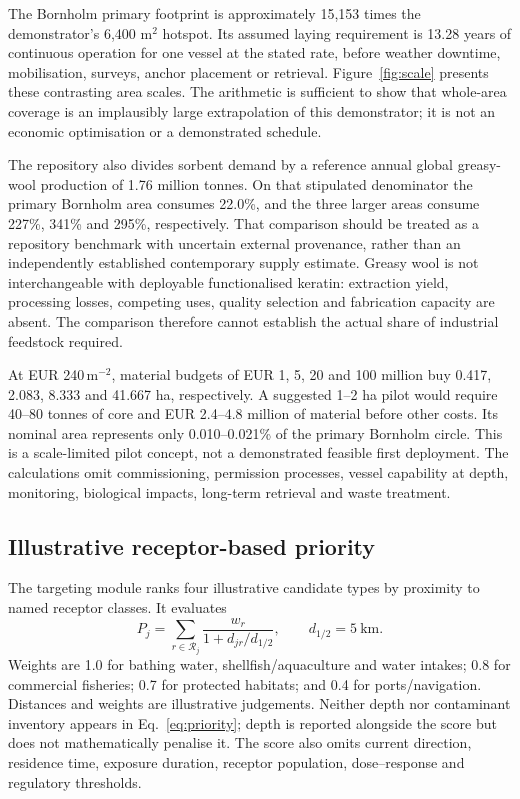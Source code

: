 The Bornholm primary footprint is approximately 15,153 times the demonstrator's 6,400 m$^2$ hotspot. Its assumed laying requirement is 13.28 years of continuous operation for one vessel at the stated rate, before weather downtime, mobilisation, surveys, anchor placement or retrieval. Figure~\ref{fig:scale} presents these contrasting area scales. The arithmetic is sufficient to show that whole-area coverage is an implausibly large extrapolation of this demonstrator; it is not an economic optimisation or a demonstrated schedule.

The repository also divides sorbent demand by a reference annual global greasy-wool production of 1.76 million tonnes. On that stipulated denominator the primary Bornholm area consumes 22.0\%, and the three larger areas consume 227\%, 341\% and 295\%, respectively. That comparison should be treated as a repository benchmark with uncertain external provenance, rather than an independently established contemporary supply estimate. Greasy wool is not interchangeable with deployable functionalised keratin: extraction yield, processing losses, competing uses, quality selection and fabrication capacity are absent. The comparison therefore cannot establish the actual share of industrial feedstock required.

At EUR 240\,m$^{-2}$, material budgets of EUR 1, 5, 20 and 100 million buy 0.417, 2.083, 8.333 and 41.667 ha, respectively. A suggested 1--2 ha pilot would require 40--80 tonnes of core and EUR 2.4--4.8 million of material before other costs. Its nominal area represents only 0.010--0.021\% of the primary Bornholm circle. This is a scale-limited pilot concept, not a demonstrated feasible first deployment. The calculations omit commissioning, permission processes, vessel capability at depth, monitoring, biological impacts, long-term retrieval and waste treatment.

\subsection{Illustrative receptor-based priority}

The targeting module ranks four illustrative candidate types by proximity to named receptor classes. It evaluates
\begin{equation}
P_j=\sum_{r\in\mathcal R_j}\frac{w_r}{1+d_{jr}/d_{1/2}},
\qquad d_{1/2}=5\ \mathrm{km}.
\label{eq:priority}
\end{equation}
Weights are 1.0 for bathing water, shellfish/aquaculture and water intakes; 0.8 for commercial fisheries; 0.7 for protected habitats; and 0.4 for ports/navigation. Distances and weights are illustrative judgements. Neither depth nor contaminant inventory appears in Eq.~\eqref{eq:priority}; depth is reported alongside the score but does not mathematically penalise it. The score also omits current direction, residence time, exposure duration, receptor population, dose--response and regulatory thresholds.

